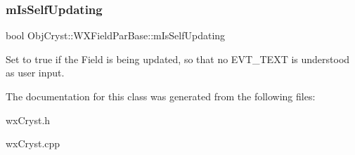 \subsubsection{\texorpdfstring{mIsSelfUpdating}{mIsSelfUpdating}}
{\footnotesize\ttfamily bool Obj\+Cryst\+::\+W\+X\+Field\+Par\+Base\+::m\+Is\+Self\+Updating\hspace{0.3cm}{\ttfamily [protected]}}

Set to true if the Field is being updated, so that no \textquotesingle{}E\+V\+T\+\_\+\+T\+E\+XT\textquotesingle{} is understood as user input. 

The documentation for this class was generated from the following files\+:\begin{DoxyCompactItemize}
\item 
wx\+Cryst.\+h\item 
wx\+Cryst.\+cpp\end{DoxyCompactItemize}
